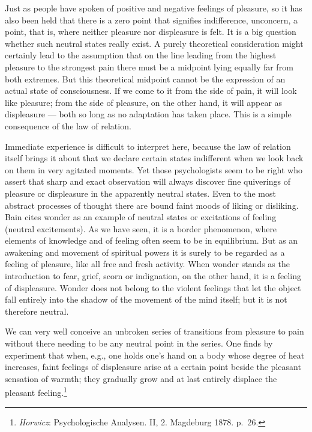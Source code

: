 \documentclass[12pt,a4paper]{book}
\newcommand{\opage}[1]{\marginnote{\footnotesize\textit{[#1]}}}
\begin{document}
Just as people have spoken of positive and negative feelings of
pleasure, so it has also been held that there is a zero point that
signifies indifference, unconcern, a point, that is, where neither
pleasure nor displeasure is felt. It is a big question whether such
neutral states really exist. A purely theoretical consideration might
certainly lead to the assumption that on the line leading from the
highest pleasure to the strongest pain there must be a midpoint lying
equally far from both extremes. But this theoretical midpoint cannot be
the expression of an actual state of consciousness. If we come to it
from the side of pain, it will look like pleasure; from the side of
pleasure, on the other hand, it will appear as displeasure --- both so
long as no adaptation has taken place. This is a simple consequence of
the law of relation.

Immediate experience is difficult to interpret here, because the law of
relation itself brings it about that we declare certain states
indifferent when we look back on them in very agitated moments. Yet
those psychologists seem to be right who assert that sharp and exact
observation will always discover fine quiverings of pleasure or
displeasure in the apparently neutral states. Even to the most abstract
processes of thought there are bound faint moods of liking or disliking.
Bain cites wonder as an example of neutral states or excitations of
feeling (neutral excitements). As we have seen, it is a border
phenomenon, where elements of knowledge and of feeling often seem to be
in equilibrium. But as an awakening
\opage{340}and movement of spiritual powers it is surely to be regarded
as a feeling of pleasure, like all free and fresh activity. When wonder
stands as the introduction to fear, grief, scorn or indignation, on the
other hand, it is a feeling of displeasure. Wonder does not belong to
the violent feelings that let the object fall entirely into the shadow
of the movement of the mind itself; but it is not therefore neutral.

We can very well conceive an unbroken series of transitions from
pleasure to pain without there needing to be any neutral point in the
series. One finds by experiment that when, e.g., one holds one's hand on
a body whose degree of heat increases, faint feelings of displeasure
arise at a certain point beside the pleasant sensation of warmth; they
gradually grow and at last entirely displace the pleasant
feeling.\footnote{\emph{Horwicz}: Psychologische Analysen. II, 2.
Magdeburg 1878. p.~26.}
\end{document}
